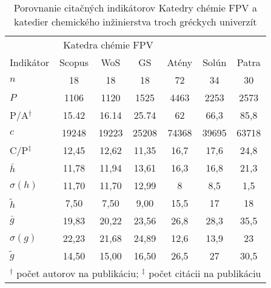 \begin{SCtable}
  \centering\small
  \caption[Porovnanie KCh FPV a kat. chem. inžinierstva troch gréckych
  univerzít]%
  {Porovnanie citačných indikátorov Katedry chémie FPV a katedier chemického
    inžinierstva troch gréckych univerzít \citep{Kazakis2015}}
  \label{tab:kazakis.results1}
  \begin{tabular}{lcccccc}
    \toprule\noalign{\vspace{.3ex}}
    & \multicolumn{3}{c}{Katedra chémie FPV} & \multicolumn{3}{c}{\citet{Kazakis2015}} \\
    \cmidrule{2-4}\cmidrule{5-7}
    Indikátor & Scopus & WoS & GS &  Atény & Solún & Patra \\[0.3ex]
    \midrule\noalign{\vspace{.5ex}}
    $n$          & 18    & 18    & 18    & 72    & 34    & 30    \\
    $P$          & 1106  & 1120  & 1525  & 4463  & 2253  & 2573  \\
    P/A$^\dagger$ & 15.42 & 16.14 & 25.74 & 62    & 66,3  & 85,8  \\
    $c$          & 19248 & 19223 & 25208 & 74368 & 39695 & 63718 \\
    C/P$^\ddagger$ & 12,45 & 12,62 & 11,35 & 16,7  & 17,6  & 24,8  \\[1ex]
    $\bar{h}$    & 11,78 & 11,94 & 13,61 & 16,3  & 16,8  & 21,3  \\
    $\sigma (h)$ & 11,70 & 11,70 & 12,99 & 8     & 8,5   & 1,5   \\
    $\tilde{h}$  & 7,50  & 7,50  & 9,00  & 15,5  & 17    & 18    \\
    $\bar{g}$    & 19,83 & 20,22 & 23,56 & 26,8  & 28,3  & 35,5  \\
    $\sigma (g)$ & 22,23 & 21,68 & 24,89 & 12,6  & 13,9  & 23    \\
    $\tilde{g}$  & 14,50 & 15,00 & 16,50 & 26,5  & 27    & 30,5  \\[0.5ex]
    \bottomrule
    \multicolumn{7}{l}{\footnotesize $^\dagger$ počet autorov na publikáciu; $^\ddagger$ počet citácii na publikáciu} \\
  \end{tabular}
\end{SCtable}

